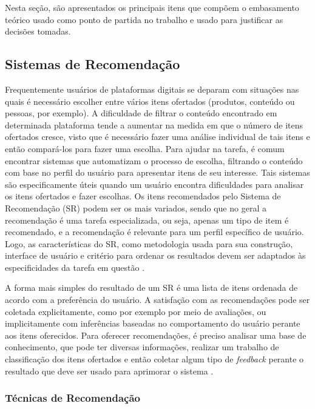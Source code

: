 \documentclass[12pt]{article}
\begin{document}
Nesta seção, são apresentados os principais itens que compõem o embasamento teórico usado como ponto de 
partida no trabalho e usado para justificar as decisões tomadas.

\subsection{Sistemas de Recomendação}

Frequentemente usuários de plataformas digitais se deparam com situações nas quais é necessário escolher entre 
vários itens ofertados (produtos, conteúdo ou pessoas, por exemplo). A dificuldade de filtrar o conteúdo encontrado em determinada 
plataforma tende a aumentar na medida em que o número de itens ofertados cresce, visto que é necessário fazer uma 
análise individual de tais itens e então compará-los para fazer uma escolha. Para ajudar na tarefa, é comum encontrar 
sistemas que automatizam o processo de escolha, filtrando o conteúdo com base no perfil do usuário para apresentar 
itens de seu interesse. Tais sistemas são especificamente úteis quando um usuário encontra dificuldades para analisar os itens 
ofertados e fazer escolhas. Os itens recomendados pelo Sistema de Recomendação (SR) podem ser os mais variados, sendo que no geral a recomendação é uma tarefa especializada, ou seja, apenas um tipo de item é recomendado, e a recomendação é relevante para um perfil 
específico de usuário. Logo, as características do SR, como metodologia usada para sua construção, interface de usuário 
e critério para ordenar os resultados devem ser adaptados às especificidades da tarefa em questão \cite{ricci2011introduction}. 

A forma mais simples do resultado de um SR é uma lista de itens ordenada de acordo com a preferência do usuário. A satisfação 
com as recomendações pode ser coletada explicitamente, como por exemplo por meio de avaliações, ou implicitamente com 
inferências baseadas no comportamento do usuário perante aos itens oferecidos. Para oferecer recomendações, é preciso analisar 
uma base de conhecimento, que pode ter diversas informações, realizar um trabalho de classificação dos itens ofertados e 
então coletar algum tipo de \textit{feedback} perante o resultado que deve ser usado para aprimorar o sistema \cite{shani2011evaluating}.

\subsubsection{Técnicas de Recomendação}
\end{document}
